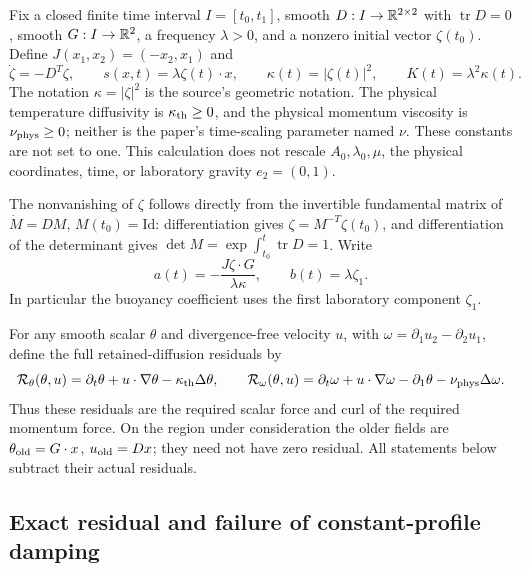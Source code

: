 Fix a closed finite time interval $I=[t_0,t_1]$, smooth
$D:I\to\mathbb R^{2\times2}$ with $\operatorname{tr}D=0$, smooth
$G:I\to\mathbb R^2$, a frequency $\lambda>0$, and a nonzero initial vector
$\zeta(t_0)$. Define $J(x_1,x_2)=(-x_2,x_1)$ and
\begin{equation}\label{cvlane:pd:eq:phase}
 \dot\zeta=-D^T\zeta,\qquad s(x,t)=\lambda\zeta(t)\cdot x,
 \qquad \kappa(t)=|\zeta(t)|^2,\qquad K(t)=\lambda^2\kappa(t).
\end{equation}
The notation $\kappa=|\zeta|^2$ is the source's geometric notation.
The physical temperature diffusivity is $\kappa_{\rm th}\geq0$, and the physical
momentum viscosity is $\nu_{\rm phys}\geq0$; neither is the paper's time-scaling
parameter named $\nu$. These constants are not set to one. This calculation
does not rescale $A_0,\lambda_0,\mu$, the physical coordinates, time, or
laboratory gravity $e_2=(0,1)$.

The nonvanishing of $\zeta$ follows directly from the invertible fundamental
matrix of $\dot M=DM$, $M(t_0)=\mathrm{Id}$: differentiation gives
$\zeta=M^{-T}\zeta(t_0)$, and differentiation of the determinant gives
$\det M=\exp\int_{t_0}^t\operatorname{tr}D=1$.
Write
\begin{equation}\label{cvlane:pd:eq:ab}
 a(t)=-\frac{J\zeta\cdot G}{\lambda\kappa},\qquad
 b(t)=\lambda\zeta_1.
\end{equation}
In particular the buoyancy coefficient uses the first laboratory component
$\zeta_1$.

For any smooth scalar $\theta$ and divergence-free velocity $u$, with
$\omega=\partial_1u_2-\partial_2u_1$, define the full retained-diffusion
residuals by
\begin{equation}\label{cvlane:pd:eq:resdef}
 \mathcal R_\theta(\theta,u)
  =\partial_t\theta+u\cdot\nabla\theta-\kappa_{\rm th}\Delta\theta,
 \qquad
 \mathcal R_\omega(\theta,u)
  =\partial_t\omega+u\cdot\nabla\omega-\partial_1\theta-\nu_{\rm phys}\Delta\omega.
\end{equation}
Thus these residuals are the required scalar force and curl of the required
momentum force. On the region under consideration the older fields are
$\theta_{\rm old}=G\cdot x$, $u_{\rm old}=Dx$; they need not have zero
residual. All statements below subtract their actual residuals.

\subsection{Exact residual and failure of constant-profile damping}

